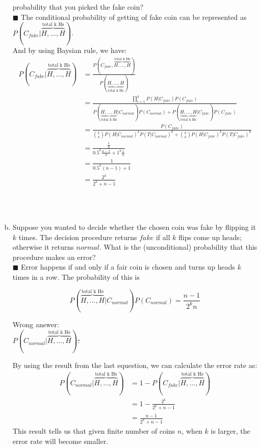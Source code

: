 \documentclass{article}
\newcommand{\solution}[1]{~\\ $\blacksquare$ \sffamily\upshape\selectfont #1
\normalfont ~\\~ }
\begin{document}
\begin{enumerate}[a.]
    probability that you picked the fake coin?
    \solution{The conditional probability of getting of fake coin can
      be represented as $P(C_{fake}|\overbrace{H,\ldots,H}^\text{total
        k Hs})$. \\
      And by using Baysian rule, we have: \\
      \begin{align*}
        P(C_{fake}|\overbrace{H,\ldots,H}^\text{total k Hs}) & =
        \frac{P(C_{fake},\overbrace{H,\ldots,H}^\text{total k
            Hs})}{P(\underbrace{H,\ldots,H}_\text{total k Hs})} \\
        & = \frac{\prod_{i=1}^k P(H|C_{fake})P(C_{fake})}
        {P(\underbrace{H,\ldots,H}_{\mbox{total k Hs}}|C_{normal})P(C_{normal}) 
          + P(\underbrace{H,\ldots,H}_{\mbox{total k Hs}}|C_{fake})P(C_{fake})} \\
        & = \frac{P(C_{fake})}{{k \choose
            k}P(H|C_{normal})^kP(T|C_{normal})^0 + {k \choose
            k}P(H|C_{fake})^kP(T|C_{fake})^0}  \\
        & = \frac{\frac{1}{n}}{0.5^k\frac{n-1}{n}+1^k\frac{1}{n}} \\
        & = \frac{1}{0.5^k(n-1)+1} \\
        & = \frac{2^k}{2^k+n-1}
      \end{align*}
} 
  \item Suppose you wanted to decide whether the chosen coin was fake by
    flipping it $k$ times.  The decision procedure returns $fake$ if all $k$
    flips come up heads; otherwise it returns $normal$. What is the
    (unconditional) probability that this procedure makes an error?
    \solution{Error happens if and only if a fair coin is chosen and
      turns up heads $k$ times in a row. The probability of this is 

      \[ P(\overbrace{H,\ldots,H}^{\mbox{total k
          Hs}}|C_{normal})P(C_{normal}) = \frac{n-1}{2^kn} \]

      Wrong answer: \\ 
      \sout{$P(C_{normal}|\overbrace{H,\ldots,H}^{\mbox{total k Hs}})$.}

      By using the result from the last equestion, we can calculate
      the error rate as: \\
      \begin{align*}
        P(C_{normal}|\overbrace{H,\ldots,H}^{\mbox{total k Hs}}) & = 
        1 - P(C_{fake}|\overbrace{H,\ldots,H}^{\mbox{total k Hs}}) \\
        & = 1 - \frac{2^k}{2^k+n-1} \\
        & = \frac{n-1}{2^k+n-1}
      \end{align*}
      This result tells us that given finite number of coins $n$, when
      $k$ is larger, the error rate will become smaller. 
    }
\end{enumerate}
\end{document}
